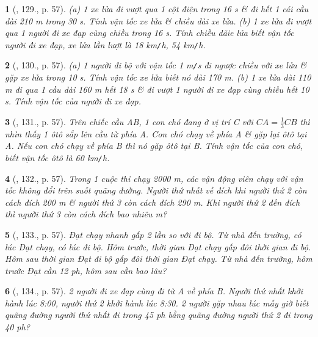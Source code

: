 \documentclass{article}
\newtheorem{baitoan}{}
\begin{document}
\begin{baitoan}[\cite{Binh_Toan_6_tap_2}, 129., p. 57]
	(a) 1 xe lửa đi vượt qua 1 cột điện trong {\rm16 s} \& đi hết 1 cái cầu dài {\rm210 m} trong {\rm30 s}. Tính vận tốc xe lửa \& chiều dài xe lửa. (b) 1 xe lửa đi vượt qua 1 người đi xe đạp cùng chiều trong {\rm16 s}. Tính chiều dãie lửa biết vận tốc người đi xe đạp, xe lửa lần lượt là {\rm18 km{\tt/}h, 54 km{\tt/}h}.
\end{baitoan}

\begin{baitoan}[\cite{Binh_Toan_6_tap_2}, 130., p. 57]
	(a) 1 người đi bộ với vận tốc {\rm1 m{\tt/}s} đi ngược chiều với xe lửa \& gặp xe lửa trong {\rm10 s}. Tính vận tốc xe lửa biết nó dài {\rm170 m}. (b) 1 xe lửa dài {\rm110 m} đi qua 1 cầu dài {\rm160 m} hết {\rm18 s} \& đi vượt 1 người đi xe đạp cùng chiều hết {\rm10 s}. Tính vận tốc của người đi xe đạp.
\end{baitoan}

\begin{baitoan}[\cite{Binh_Toan_6_tap_2}, 131., p. 57]
	Trên chiếc cầu AB, 1 con chó đang ở vị trí C với $CA = \frac{1}{3}CB$ thì nhìn thấy 1 ôtô sắp lên cầu từ phía A. Con chó chạy về phía A \& gặp lại ôtô tại A. Nếu con chó chạy về phía B thì nó gặp ôtô tại B. Tính vận tốc của con chó, biết vận tốc ôtô là {\rm60 km{\tt/}h}.
\end{baitoan}

\begin{baitoan}[\cite{Binh_Toan_6_tap_2}, 132., p. 57]
	Trong 1 cuộc thi chạy {\rm2000 m}, các vận động viên chạy với vận tốc không đổi trên suốt quãng đường. Người thứ nhất về đích khi người thứ 2 còn cách đích {\rm200 m} \& người thứ 3 còn cách đích {\rm290 m}. Khi người thứ 2 đến đích thì người thứ 3 còn cách đích bao nhiêu {\rm m}?
\end{baitoan}

\begin{baitoan}[\cite{Binh_Toan_6_tap_2}, 133., p. 57]
	Đạt chạy nhanh gấp 2 lần so với đi bộ. Từ nhà đến trường, có lúc Đạt chạy, có lúc đi bộ. Hôm trước, thời gian Đạt chạy gấp đôi thời gian đi bộ. Hôm sau thời gian Đạt đi bộ gấp đôi thời gian Đạt chạy. Từ nhà đến trường, hôm trước Đạt cần {\rm12 ph}, hôm sau cần bao lâu?
\end{baitoan}

\begin{baitoan}[\cite{Binh_Toan_6_tap_2}, 134., p. 57]
	2 người đi xe đạp cùng đi từ A về phía B. Người thứ nhất khởi hành lúc {\rm8:00}, người thứ 2 khởi hành lúc {\rm8:30}. 2 người gặp nhau lúc mấy giờ biết quãng đường người thứ nhất đi trong {\rm45 ph} bằng quãng đường người thứ 2 đi trong {\rm40 ph}?
\end{baitoan}
\end{document}
